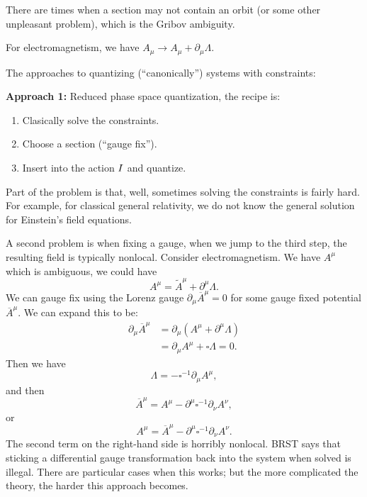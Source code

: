 There are times when a section may not contain an orbit (or some other
unpleasant problem), which is the Gribov ambiguity.

For electromagnetism, we have $A_{\mu}\to
A_{\mu}+\partial_{\mu}\Lambda$.

The approaches to quantizing (``canonically'') systems with constraints:

\bigbreak
\textbf{Approach 1:} Reduced phase space quantization, the recipe is:
\begin{enumerate}[nosep,label=(\arabic*)]
\item Clasically solve the constraints.
\item Choose a section (``gauge fix'').
\item Insert into the action $I$ and quantize.
\end{enumerate}
Part of the problem is that, well, sometimes solving the constraints
is fairly hard. For example, for classical general relativity, we do
not know the general solution for Einstein's field equations.

A second problem is when fixing a gauge, when we jump to the third step,
the resulting field is typically nonlocal. Consider electromagnetism. We
have $A^{\mu}$ which is ambiguous, we could have
\begin{equation}
A^{\mu} = \widetilde{A}^{\mu} + \partial^{\mu}\Lambda.
\end{equation}
We can gauge fix using the Lorenz gauge
$\partial_{\mu}\overline{A}^{\mu}=0$ for some gauge fixed potential
$\overline{A}^{\mu}$. We can expand this to be:
\begin{subequations}
\begin{align}
\partial_{\mu}\overline{A}^{\mu}
&= \partial_{\mu}(A^{\mu} + \partial^{\mu}\Lambda)\\
&=\partial_{\mu}A^{\mu} + \square\Lambda = 0.
\end{align}
\end{subequations}
Then we have
\begin{equation}
\Lambda = -\square^{-1}\partial_{\mu}A^{\mu},
\end{equation}
and then
\begin{equation}
\overline{A}^{\mu} = A^{\mu} - \partial^{\mu}\square^{-1}\partial_{\nu}A^{\nu},
\end{equation}
or
\begin{equation}
A^{\mu} = \overline{A}^{\mu}  - \partial^{\mu}\square^{-1}\partial_{\nu}A^{\nu}.
\end{equation}
The second term on the right-hand side is horribly nonlocal. BRST says
that sticking a differential gauge transformation back into the system
when solved is illegal. There are particular cases when this works; but
the more complicated the theory, the harder this approach becomes.

